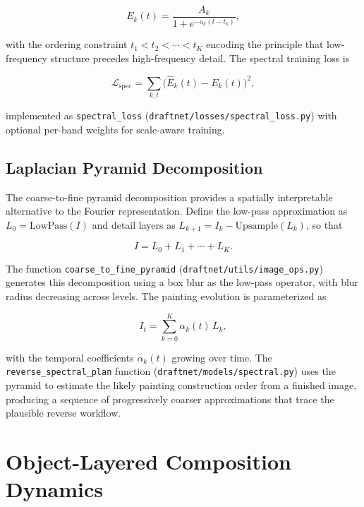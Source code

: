 \documentclass[12pt,a4paper]{article}
\theoremstyle{draftthm}
\newcommand{\code}[1]{\texttt{\small #1}}
\begin{document}
\begin{equation}
  E_k(t) = \frac{A_k}{1 + e^{-a_k(t - t_k)}},
  \label{eq:logistic-growth}
\end{equation}

with the ordering constraint $t_1 < t_2 < \cdots < t_K$ encoding the principle that low-frequency structure precedes high-frequency detail. The spectral training loss is

\begin{equation}
  \mathcal{L}_{\mathrm{spec}}
  =
  \sum_{k,t}
  \bigl(\hat{E}_k(t) - E_k(t)\bigr)^2,
  \label{eq:spectral-loss}
\end{equation}

implemented as \code{spectral\_loss} (\code{draftnet/losses/spectral\_loss.py}) with optional per-band weights for scale-aware training.

\subsection{Laplacian Pyramid Decomposition}

The coarse-to-fine pyramid decomposition provides a spatially interpretable alternative to the Fourier representation. Define the low-pass approximation as $L_0 = \mathrm{LowPass}(I)$ and detail layers as $L_{k+1} = I_k - \mathrm{Upsample}(L_k)$, so that

\begin{equation}
  I = L_0 + L_1 + \cdots + L_K.
\end{equation}

The function \code{coarse\_to\_fine\_pyramid} (\code{draftnet/utils/image\_ops.py}) generates this decomposition using a box blur as the low-pass operator, with blur radius decreasing across levels. The painting evolution is parameterized as

\begin{equation}
  I_t = \sum_{k=0}^{K} \alpha_k(t)\, L_k,
\end{equation}

with the temporal coefficients $\alpha_k(t)$ growing over time. The \code{reverse\_spectral\_plan} function (\code{draftnet/models/spectral.py}) uses the pyramid to estimate the likely painting construction order from a finished image, producing a sequence of progressively coarser approximations that trace the plausible reverse workflow.

\section{Object-Layered Composition Dynamics}
\end{document}
